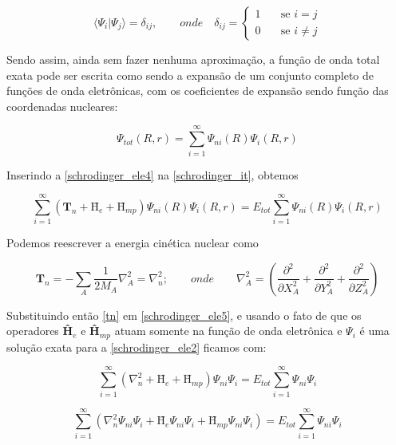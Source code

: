 	\begin{equation}
	\label{schrodinger_ele3}
	\langle\Psi_i|\Psi_j\rangle = \delta_{ij}, \qquad onde \quad
	\delta_{ij} =
	\begin{cases}
	1 & \quad \text{se } i=j\\
	0 & \quad \text{se } i\neq j
	\end{cases}
	\end{equation}
	
	Sendo assim, ainda sem fazer nenhuma aproximação, a função de onda total exata pode ser escrita como sendo a expansão de um conjunto completo de funções de onda eletrônicas, com os coeficientes de expansão sendo função das coordenadas nucleares:
	
	\begin{equation}
	\label{schrodinger_ele4}
	\Psi_{tot}(R,r) = \sum_{i=1}^{\infty} \Psi_{ni}(R)\Psi_{i}(R,r)
	\end{equation}
	
	Inserindo a \autoref{schrodinger_ele4} na \autoref{schrodinger_it}, obtemos
	
	\begin{equation}
	\label{schrodinger_ele5}
	\sum_{i=1}^{\infty} \left( \textbf{\^T}_n + \textbf{\^H}_e + \textbf{\^H}_{mp}\right) \Psi_{ni}(R)\Psi_{i}(R,r) = E_{tot} \sum_{i=1}^{\infty} \Psi_{ni}(R)\Psi_{i}(R,r)
	\end{equation}
	
	Podemos reescrever a energia cinética nuclear como
	
	\begin{equation}
	\label{tn}
	\textbf{\^T}_n = -\sum_{A} \frac{1}{2M_A}\nabla_A^2 = \nabla_n^2; \qquad onde  \qquad \nabla_A^2 = \left( \frac{\partial^2}{\partial X_A^2} + \frac{\partial^2}{\partial Y_A^2} + \frac{\partial^2}{\partial Z_A^2} \right)
	\end{equation}
	
	Substituindo então \ref{tn} em \ref{schrodinger_ele5}, e usando o fato de que os operadores \textbf{\^H}$_{e}$ e \textbf{\^H}$_{mp}$ atuam somente na função de onda eletrônica e $\Psi_{i}$ é uma solução exata para a \autoref{schrodinger_ele2} ficamos com:
	
	\begin{equation}
	\sum_{i=1}^{\infty} \left( \nabla_n^2 + \textbf{\^H}_e + \textbf{\^H}_{mp}\right) \Psi_{ni}\Psi_{i} = E_{tot} \sum_{i=1}^{\infty} \Psi_{ni}\Psi_{i}
	\end{equation}
	
	\begin{equation}
	\sum_{i=1}^{\infty} \left( \nabla_n^2 \Psi_{ni}\Psi_{i}  + \textbf{\^H}_e \Psi_{ni}\Psi_{i}  + \textbf{\^H}_{mp} \Psi_{ni}\Psi_{i} \right) = E_{tot} \sum_{i=1}^{\infty} \Psi_{ni}\Psi_{i}
	\end{equation}
	
